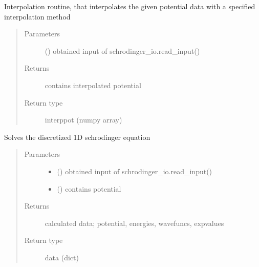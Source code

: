 \documentclass[letterpaper,10pt,english]{sphinxmanual}
\begin{document}
\begin{fulllineitems}
\label{\detokenize{index:schrodinger_solver.interpolate}}
Interpolation routine, that interpolates the given potential data with
a specified interpolation method
\begin{quote}\begin{description}
\item[{Parameters}] \leavevmode
{} () \textendash{} obtained input of schrodinger\_io.read\_input()

\item[{Returns}] \leavevmode
contains interpolated potential

\item[{Return type}] \leavevmode
interppot (numpy array)

\end{description}\end{quote}

\end{fulllineitems}


\begin{fulllineitems}
\label{\detokenize{index:schrodinger_solver.solve1d}}
Solves the discretized 1D schrodinger equation
\begin{quote}\begin{description}
\item[{Parameters}] \leavevmode\begin{itemize}
\item {} 
 () \textendash{} obtained input of schrodinger\_io.read\_input()

\item {} 
 () \textendash{} contains potential

\end{itemize}

\item[{Returns}] \leavevmode
calculated data; potential, energies, wavefuncs, expvalues

\item[{Return type}] \leavevmode
data (dict)

\end{description}\end{quote}

\end{fulllineitems}
\end{document}
